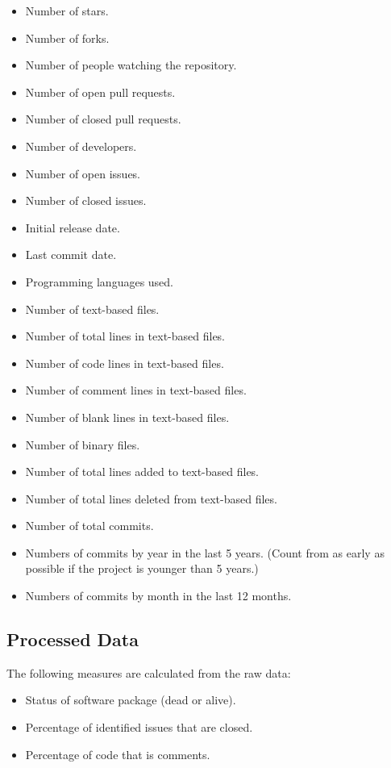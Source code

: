 \documentclass[letterpaper,cleveref]{lipics-v2019}
\theoremstyle{definition}
\begin{document}
\begin{itemize}
\item Number of stars.
\item Number of forks.
\item Number of people watching the repository.
\item Number of open pull requests.
\item Number of closed pull requests.	
\item Number of developers.	
\item Number of open issues.
\item Number of closed issues.
\item Initial release date.
\item Last commit date.
\item Programming languages used.
\item Number of text-based files.
\item Number of total lines in text-based files.
\item Number of code lines in text-based files.
\item Number of comment lines in text-based files.
\item Number of blank lines in text-based files.
\item Number of binary files.  
\item Number of total lines added to text-based files.
\item Number of total lines deleted from text-based files.
\item Number of total commits.
\item Numbers of commits by year in the last 5 years. (Count from as early as possible if the project is younger than 5 years.) 
\item Numbers of commits by month in the last 12 months.
\end{itemize}


\subsection{Processed Data}
The following measures are calculated from the raw data:

\begin{itemize}
\item Status of software package (dead or alive).
\item Percentage of identified issues that are closed.
\item Percentage of code that is comments.
\end{itemize}
\end{document}
